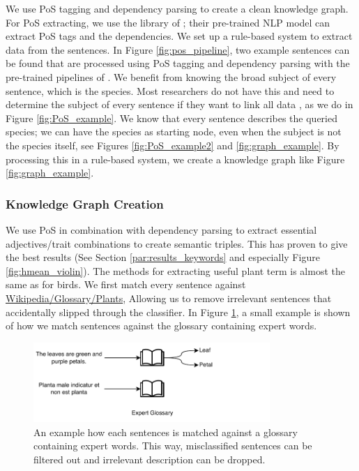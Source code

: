 \documentclass[a4paper, 12pt, oneside]{book} %
\begin{document}
We use PoS tagging and dependency parsing to create a clean knowledge graph.
For PoS extracting, we use the library of \textcite{honnibal_spacy_2020}; their pre-trained NLP model can extract PoS tags and the dependencies.
We set up a rule-based system to extract data from the sentences.
In Figure \ref{fig:pos_pipeline}, two example sentences can be found that are processed using PoS tagging and dependency parsing with the pre-trained pipelines of \textcite{honnibal_spacy_2020}.
We benefit from knowing the broad subject of every sentence, which is the species.
Most researchers do not have this and need to determine the subject of every sentence if they want to link all data \autocite{hutchison_knowledge_2013}, as we do in Figure \ref{fig:PoS_example}.
We know that every sentence describes the queried species; we can have the species as starting node, even when the subject is not the species itself, see Figures \ref{fig:PoS_example2} and \ref{fig:graph_example}.
By processing this in a rule-based system, we create a knowledge graph like Figure \ref{fig:graph_example}.

\subsubsection{Knowledge Graph Creation}
We use PoS in combination with dependency parsing to extract essential adjectives/trait combinations to create semantic triples.
This has proven to give the best results (See Section \ref{par:results_keywords} and especially Figure \ref{fig:hmean_violin}).
The methods for extracting useful plant term is almost the same as for birds.
We first match every sentence against \href{https://en.wikipedia.org/wiki/Glossary_of_plant_morphology}{Wikipedia/Glossary/Plants},
Allowing us to remove irrelevant sentences that accidentally slipped through the classifier.
In Figure \ref{fig:glossary}, a small example is shown of how we match sentences against the glossary containing expert words.
\begin{figure} [htpb]
    \centering
    \includegraphics[width=0.8\textwidth]{figures/glossary_workflow.pdf}
    \caption[Expert Glossary Example]{An example how each sentences is matched against a glossary containing expert words. This way, misclassified sentences can be filtered out and irrelevant description can be dropped.}
    \label{fig:glossary}
\end{figure}
\end{document}
